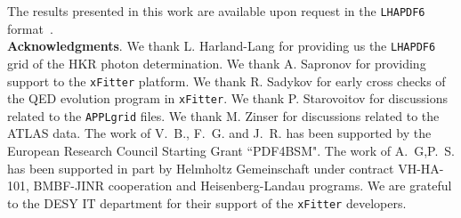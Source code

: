 The results presented in this work are available upon
request in the {\tt LHAPDF6} format~\cite{Buckley:2014ana}.\\

{\bf Acknowledgments}.
%
We thank L. Harland-Lang for providing us the {\tt LHAPDF6} grid of
the HKR photon determination.
%
We thank A. Sapronov for providing support to the {\tt xFitter} platform.
%
We thank R. Sadykov for early cross checks of the QED evolution program in {\tt xFitter}.
%
We thank P. Starovoitov for discussions related to the {\tt APPLgrid} files.
%
We thank M. Zinser for discussions related to the ATLAS data.
% 
The work of V.~B., F.~G. and J.~R. has been supported by the European
Research Council Starting Grant ``PDF4BSM".
%
The work of A.~G,P.~S. has been supported in part by Helmholtz Gemeinschaft
under contract VH-HA-101, BMBF-JINR cooperation and Heisenberg-Landau programs.
%
We are grateful to the DESY IT department for their support of the {\tt xFitter} developers. 



